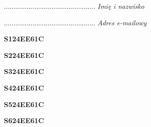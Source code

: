 \begin{turn}{90}\begin{minipage}{\linewidth} \vspace{20mm} ................................................  \textit{Imię i nazwisko}\end{minipage}\end{turn}

\begin{turn}{90}\begin{minipage}{\linewidth} \vspace{20mm} ................................................  \textit{Adres e-mailowy}\end{minipage}\end{turn}

\begin{turn}{90}\huge \begin{minipage}{\linewidth} \vspace{10mm}\textbf{S124EE61C}\end{minipage}\end{turn}

\begin{turn}{90}\huge \begin{minipage}{\linewidth} \vspace{10mm}\textbf{S224EE61C}\end{minipage}\end{turn}

\begin{turn}{90}\huge \begin{minipage}{\linewidth} \vspace{10mm}\textbf{S324EE61C}\end{minipage}\end{turn}

\begin{turn}{90}\huge \begin{minipage}{\linewidth} \vspace{10mm}\textbf{S424EE61C}\end{minipage}\end{turn}

\begin{turn}{90}\huge \begin{minipage}{\linewidth} \vspace{10mm}\textbf{S524EE61C}\end{minipage}\end{turn}

\begin{turn}{90}\huge \begin{minipage}{\linewidth} \vspace{10mm}\textbf{S624EE61C}\end{minipage}\end{turn}

